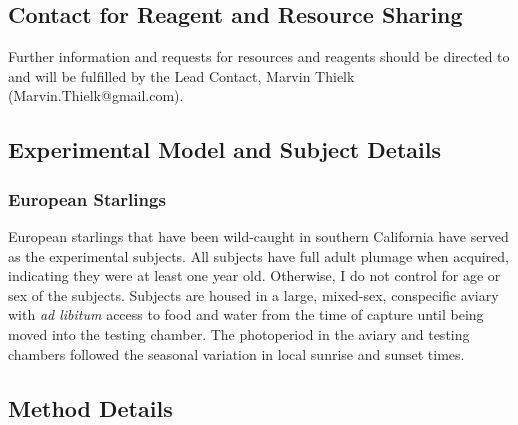 \subsection{Contact for Reagent and Resource Sharing}
Further information and requests for resources and reagents should be directed to and will be fulfilled by the Lead Contact, Marvin Thielk (Marvin.Thielk@gmail.com).

\subsection{Experimental Model and Subject Details}
\subsubsection{European Starlings}
European starlings that have been wild-caught in southern California have served as the experimental subjects. All subjects have full adult plumage when acquired, indicating they were at least one year old. Otherwise, I do not control for age or sex of the subjects. Subjects are housed in a large, mixed-sex, conspecific aviary with \textit{ad libitum} access to food and water from the time of capture until being moved into the testing chamber. The photoperiod in the aviary and testing chambers followed the seasonal variation in local sunrise and sunset times.

\subsection{Method Details}

